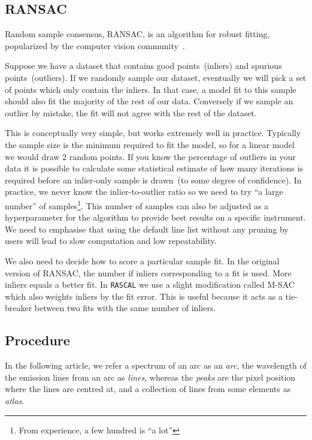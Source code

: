 \documentclass{aa}
\begin{document}
\subsection{RANSAC}
Random sample consensus, RANSAC, is an algorithm for robust fitting,
popularized by the computer vision community~\citep{fischler_bolles_1981}.

Suppose we have a dataset that contains good points~(inliers) and spurious
points~(outliers). If we randomly sample our dataset, eventually we will
pick a set of points which only contain the inliers. In that case, a model
fit to this sample should also fit the majority of the rest of our data.
Conversely if we sample an outlier by mistake, the fit will not agree with
the rest of the dataset.

This is conceptually very simple, but works extremely well in practice.
Typically the sample size is the minimum required to fit the model, so for
a linear model we would draw 2 random points. If you know the percentage of
outliers in your data it is possible to calculate some statistical estimate
of how many iterations is required before an inlier-only sample is drawn~(to
some degree of confidence). In practice, we never know the inlier-to-outlier
ratio so we need to try ``a large number'' of samples\footnote{From experience,
a few hundred is ``a lot''}. This number of samples can also be adjusted as 
a hyperparameter for the algorithm to provide best results on a specific
instrument. We need to emphasise that using the default line list without any
pruning by users will lead to slow computation and low repeatability.

We also need to decide how to score a particular sample fit. In the original
version of RANSAC, the number if inliers corresponding to a fit is used. More
inliers equals a better fit. In \texttt{RASCAL} we use a slight modification called
M-SAC~\citep{Torr00mlesac:a} which also weights inliers by the fit error.
This is useful because it acts as a tie-breaker between two fits with the
same number of inliers.

\subsection{Procedure}
In the following article, we refer a spectrum of an arc as an \textit{arc},
the wavelength of the emission lines from an arc as \textit{lines}, whereas 
the \textit{peaks} are the pixel position where the lines are centred at,
and a collection of lines from some elements as \textit{atlas}.
\end{document}
